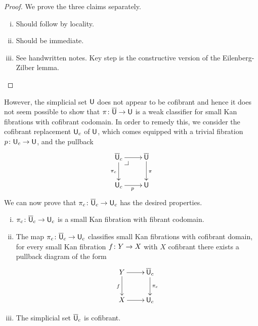 \documentclass[reqno,10pt,a4paper,oneside,draft]{amsart}
\begin{document}
\begin{proof} We prove the three claims separately.
\begin{enumerate}[(i)] 
\item Should follow by locality.
\item Should be immediate.
\item See handwritten notes. Key step is the constructive version of the Eilenberg-Zilber lemma. \qedhere
\end{enumerate}
\end{proof} 

However, the simplicial set $\mathsf{U}$ does not appear to be cofibrant and hence it does not seem possible to show that  $\pi \colon \overline{\mathsf{U}} \to \mathsf{U}$ is a weak classifier for small Kan fibrations with cofibrant codomain. In order to remedy this, we consider the cofibrant replacement $\mathsf{U}_c$ of $\mathsf{U}$, which comes equipped
with a trivial fibration $p \colon \mathsf{U}_c \to \mathsf{U}$, and the pullback
\[
\xymatrix{
\UU_c \ar[d]_{\pi_c} \ar[r] \drpullback & \UU \ar[d]^{\pi}  \\
\U_c \ar[r]_p & \U}
\]
We can now prove that $\pi_c \colon \overline{\mathsf{U}}_c \to \mathsf{U}_c$ has the desired properties.


\begin{proposition} \label{thm:universe-uc} 
\hfill 
\begin{enumerate}[(i)] 
\item $\pi_c \colon \overline{\mathsf{U}}_c \to \mathsf{U}_c$ is a small Kan fibration with fibrant codomain. 
\item The map $\pi_c \colon \overline{\mathsf{U}}_c \to \mathsf{U}_c$ classifies small Kan fibrations with cofibrant domain, \ie 
for every small Kan fibration $f \colon Y \to X$ with $X$ cofibrant there exists  a pullback diagram of the form
\[
\xymatrix{
Y \ar[r] \ar[d]_f & \UU_c \ar[d]^{\pi_c} \\
X \ar[r] & \U_c }
\]
\item The simplicial set $\overline{\mathsf{U}}_c$ is cofibrant.
\end{enumerate}
\end{proposition}
\end{document}
